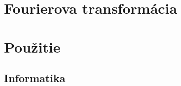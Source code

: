 %
%


\chapter{Fourierova transformácia}
    
    
    
    
    
    
    

%    
%    
%    
%    
%    
%    
%    
%    
%    
%    

\chapter{Použitie}
%    
%    
%    
%    
%    
         
%    
%    
%    
%    
    
\section{Informatika}
    
    
    
    
    
    
    
    


